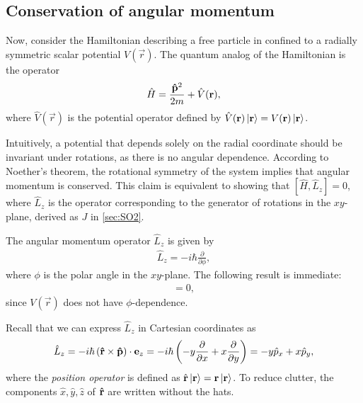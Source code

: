     \subsection{Conservation of angular momentum}\label{sub:cons_ang_mom}
    Now, consider the Hamiltonian describing a free particle in confined to a radially symmetric scalar potential $V(\vec{r})$.
    The quantum analog of the Hamiltonian is the operator
    \begin{align*}
        \hat{H} = \frac{\mathbf{\hat{p}}^2}{2m}  + \hat{V}(\mathbf{r}),
    \end{align*}
    where $\hat{V}(\vec{r})$ is the potential operator defined by $\hat{V}(\mathbf{r})\ket{\mathbf{r}} = V(\mathbf{r})\ket{\mathbf{r}}$.

    Intuitively, a potential that depends solely on the radial coordinate should be invariant under rotations, as there is no angular dependence. According to Noether's theorem, the rotational symmetry of the system implies that angular momentum is conserved. This claim is equivalent to showing that $[\hat{H},\hat{L}_z] = 0$, where $\hat{L}_z$ is the operator corresponding to the generator of rotations in the $xy$-plane, derived as $J$ in \cref{sec:SO2}.

    The angular momentum operator $\hat{L}_z$ is given by
    \begin{align*}
        \hat{L}_z = -i\hbar \frac{\partial}{\partial\phi},
    \end{align*}
    where $\phi$ is the polar angle in the $xy$-plane. The following result is immediate:
    \begin{align*}
        [V(\vec{r}),\hat{L}_z] = 0,
    \end{align*}
    since $V(\vec{r})$ does not have $\phi$-dependence.

    Recall that we can express $\hat{L}_z$ in Cartesian coordinates as
    \begin{align}\label{eq:Lz_cartesian}
        \hat{L}_z = -i\hbar \left( \mathbf{\hat{r}}\times\mathbf{\hat{p}} \right)\cdot\mathbf{e}_z = -i\hbar\left( -y\frac{\partial}{\partial x} + x\frac{\partial}{\partial y} \right) =  -y \hat{p}_x + x \hat{p}_y,
    \end{align}
    where the \textit{position operator} is defined as $\hat{\mathbf{r}}\ket{\mathbf{r}} = \mathbf{r}\ket{\mathbf{r}}$. To reduce clutter, the components $\hat{x}, \hat{y}, \hat{z}$ of $\mathbf{\hat{r}}$ are written without the hats.

